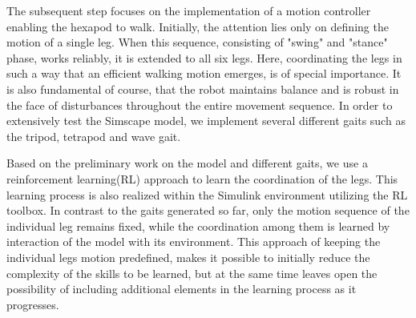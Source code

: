 The subsequent step focuses on the implementation of a motion controller enabling the hexapod to walk.
Initially, the attention lies only on defining the motion of a single leg.
When this sequence, consisting of "swing" and "stance" phase, works reliably, it is extended to all six legs.
Here, coordinating the legs in such a way that an efficient walking motion emerges, is of special importance.
It is also fundamental of course, that the robot maintains balance and is robust in the face of disturbances throughout the entire movement sequence.
In order to extensively test the Simscape model, we implement several different gaits such as the tripod, tetrapod and wave gait.

Based on the preliminary work on the model and different gaits, we use a reinforcement learning(RL) approach to learn the coordination of the legs.
This learning process is also realized within the Simulink environment utilizing the RL toolbox.
In contrast to the gaits generated so far, only the motion sequence of the individual leg remains fixed, while the coordination among them is learned by interaction of the model with its environment. 
This approach of keeping the individual legs motion predefined, makes it possible to initially reduce the complexity of the skills to be learned, but at the same time leaves open the possibility of including additional elements in the learning process as it progresses.

